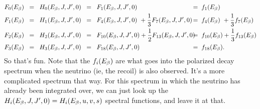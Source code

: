 \begin{align}
F_0(\Ee) & \;\;=\;\; H_0(\Ee, J, J^\prime, 0) \;\;=\;\; F_1(\Ee, J, J^\prime, 0) 
	\!\!\!\! \!\! \!\! 
	& =\;\; & f_1(\Ee) 
	\\
F_1(\Ee) & \;\;=\;\; H_1(\Ee, J, J^\prime, 0) \;\;=\;\; F_4(\Ee, J, J^\prime, 0) \,\,+ \frac{1}{3}F_7(\Ee, J, J^\prime, 0) 
	\!\!\!\! \!\! \!\! 
	& =\;\; & f_4(\Ee) \,\,+ \frac{1}{3}f_7(\Ee) 
	\\
F_2(\Ee) & \;\;=\;\; H_2(\Ee, J, J^\prime, 0) \;\;=\;\; F_{10}(\Ee, J, J^\prime, 0) + \frac{1}{2}F_{13}(\Ee, J, J^\prime, 0) 
	\!\!\!\! \!\! \!\! 
	& =\;\; & f_{10}(\Ee) + \frac{1}{3}f_{13}(\Ee) 
	\\
F_3(\Ee) & \;\;=\;\; H_3(\Ee, J, J^\prime, 0) \;\;=\;\; F_{18}(\Ee, J, J^\prime, 0) 
	\!\!\!\! \!\! \!\! 
	& =\;\; & f_{18}(\Ee) .
\end{align}
So that's fun.  Note that the $f_i(E_{\beta})$ are what goes into the polarized decay spectrum when the neutrino (ie, the recoil) is also observed.  It's a more complicated spectrum that way.  For this spectrum in which the neutrino has already been integrated over, we can just look up the $H_i(E_{\beta}, J, J^\prime, 0) = H_i(E_{\beta}, u, v, s)$ spectral functions, and leave it at that.

